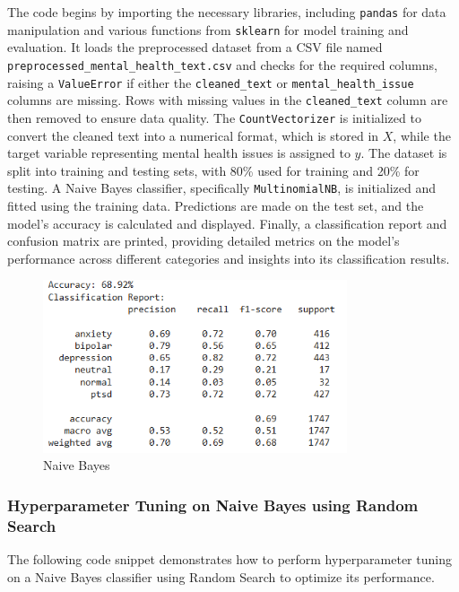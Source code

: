 \noindent
The code begins by importing the necessary libraries, including \texttt{pandas} for data manipulation and various functions from \texttt{sklearn} for model training and evaluation. It loads the preprocessed dataset from a CSV file named \newline
\texttt{preprocessed\_mental\_health\_text.csv} and checks for the required columns, raising a \texttt{ValueError} if either the \texttt{cleaned\_text} or \texttt{mental\_health\_issue} columns are missing. Rows with missing values in the \texttt{cleaned\_text} column are then removed to ensure data quality. The \texttt{CountVectorizer} is initialized to convert the cleaned text into a numerical format, which is stored in \(X\), while the target variable representing mental health issues is assigned to \(y\). The dataset is split into training and testing sets, with 80\% used for training and 20\% for testing. A Naive Bayes classifier, specifically \texttt{MultinomialNB}, is initialized and fitted using the training data. Predictions are made on the test set, and the model's accuracy is calculated and displayed. Finally, a classification report and confusion matrix are printed, providing detailed metrics on the model's performance across different categories and insights into its classification results.

\begin{figure}[h!]  
    \centering
    \includegraphics[width=0.8\textwidth]{Images/Output NB.png}  
    \caption{Naive Bayes}
    \label{NB}  %
\end{figure}

\subsubsection{Hyperparameter Tuning on Naive Bayes using Random Search}
\noindent
The following code snippet demonstrates how to perform hyperparameter tuning on a Naive Bayes classifier using Random Search to optimize its performance.

